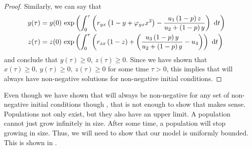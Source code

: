 \begin{proof}
    Similarly, we can say that
    \begin{align*}
        y(\tau) &= y(0)\ \exp{\int_0^\tau \left(r_{yx}\left(1-y+\varphi_{yx}x^2\right)-\frac{u_1\left(1-p\right)z}{u_2+\left(1-p\right)y}\right)\ \opdiff{t}}\\
        z(\tau) &= z(0)\ \exp{\int_0^\tau \left(r_{zx}\left(1-z\right)+\left(\frac{u_3\left(1-p\right)y}{u_2+\left(1-p\right)y}-u_4\right)\right)\ \opdiff{t}}
    \end{align*}
    and conclude that $y(\tau) \geq 0,\ z(\tau) \geq 0$.
    Since we have shown that $x(\tau) \geq 0,\ y(\tau) \geq 0,\ z(\tau) \geq 0$ for some time $\tau > 0$, this implies that  will always have non-negative solutions for non-negative initial conditions.
\end{proof}
    Even though we have shown that  will always be non-negative for any set of non-negative initial conditions though , that is not enough to show that  makes sense.
    Populations not only exist, but they also have an upper limit.
    A population cannot just grow infinitely in size.
    After some time, a population will stop growing in size.
    Thus, we will need to show that our model is uniformly bounded.
    This is shown in .

